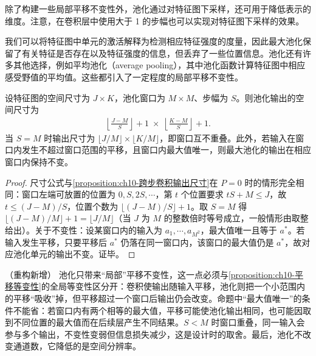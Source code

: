 \documentclass[../../main.tex]{subfiles}
\begin{document}
除了构建一些局部平移不变性外，池化通过对特征图下采样，还可用于降低表示的维度。注意，在卷积层中使用大于 1 的步幅也可以实现对特征图下采样的效果。

我们可以将特征图中单元的激活解释为检测相应特征强度的度量，因此最大池化保留了有关特征是否存在以及特征强度的信息，但丢弃了一些位置信息。池化还有许多其他选择，例如平均池化（average pooling），其中池化函数计算特征图中相应感受野值的平均值。这些都引入了一定程度的局部平移不变性。

\begin{proposition}[池化的输出尺寸与局部不变性]\label{proposition:ch10-池化输出尺寸}
设特征图的空间尺寸为 $J\times K$，池化窗口为 $M\times M$、步幅为 $S$。则池化输出的空间尺寸为
\begin{align}
  \left\lfloor\frac{J-M}{S}\right\rfloor+1
  \;\times\;
  \left\lfloor\frac{K-M}{S}\right\rfloor+1 .
  \label{align:ch10-池化输出尺寸}
\end{align}
当 $S=M$ 时输出尺寸为 $\lfloor J/M\rfloor\times\lfloor K/M\rfloor$，即窗口互不重叠。此外，若输入在窗口内发生不超过窗口范围的平移，且窗口内最大值唯一，则最大池化的输出在相应窗口内保持不变。
\end{proposition}
\begin{proof}
尺寸公式与\cref{proposition:ch10-跨步卷积输出尺寸}在 $P=0$ 时的情形完全相同：窗口左端可放置的位置为 $0,S,2S,\cdots$，第 $t$ 个位置要求 $tS+M\leqslant J$，故 $t\leqslant (J-M)/S$，位置个数为 $\lfloor (J-M)/S\rfloor+1$。取 $S=M$ 得 $\lfloor (J-M)/M\rfloor+1=\lfloor J/M\rfloor$（当 $J$ 为 $M$ 的整数倍时等号成立，一般情形由取整给出）。关于不变性：设某窗口内的输入为 $a_1,\cdots,a_{M^2}$，最大值唯一且等于 $a^\ast$。若输入发生平移，只要平移后 $a^\ast$ 仍落在同一窗口内，该窗口的最大值仍是 $a^\ast$，故对应池化单元的输出不变。证毕。
\end{proof}

\begin{remark}（重构新增）
池化只带来“局部”平移不变性，这一点必须与\cref{proposition:ch10-平移等变性}的全局等变性区分开：卷积使输出随输入平移，池化则把一个小范围内的平移“吸收”掉，但平移超过一个窗口后输出仍会改变。命题中“最大值唯一”的条件不能省：若窗口内有两个相等的最大值，平移可能使池化输出相同，也可能因取到不同位置的最大值而在后续层产生不同结果。$S<M$ 时窗口重叠，同一输入会参与多个输出，不变性变弱但信息损失减少，这是设计时的取舍。最后，池化不改变通道数，它降低的是空间分辨率。
\end{remark}
\end{document}
